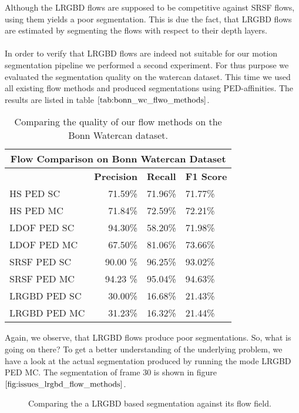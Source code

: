 Although the LRGBD flows are supposed to be competitive against SRSF flows, using them yields a poor segmentation. This is due the fact, that LRGBD flows are estimated by segmenting the flows with respect to their depth layers. \\ \\
In order to verify that LRGBD flows are indeed not suitable for our motion segmentation pipeline we performed a second experiment. For thus purpose we evaluated the segmentation quality on the watercan dataset. This time we used all existing flow methods and produced segmentations using PED-affinities. The results are listed in table $\ref{tab:bonn_wc_flwo_methods}$.
\begin{table}[H]
\centering
\begin{tabular}{|l|r|l|l|}
\hline
\multicolumn{4}{|c|}{Flow Comparison on Bonn Watercan Dataset} \\ \hline
& \textbf{Precision} & \textbf{Recall} & \textbf{F1 Score} \\ \hline            
HS PED SC  & 71.59\%   & 71.96\%     & 71.77\%  \\ \hline
HS PED MC  & 71.84\%   & 72.59\%     & 72.21\%  \\ \hline                        
LDOF PED SC  & 94.30\%   & 58.20\%     & 71.98\%  \\ \hline
LDOF PED MC  & 67.50\%   & 81.06\%     & 73.66\%  \\ \hline
SRSF PED SC & 90.00 \%   & 96.25\%     & 93.02\%  \\ \hline
SRSF PED MC & 94.23 \%   & 95.04\%     & 94.63\%  \\ \hline
LRGBD PED SC & 30.00\%   & 16.68\%     & 21.43\%  \\ \hline
LRGBD PED MC & 31.23\%   & 16.32\%     & 21.44\%  \\ \hline
\end{tabular}
\caption[Flow Method Comparission Bonn Watercan]{Comparing the quality of our flow methods on the Bonn Watercan dataset.}
\label{tab:bonn_wc_flwo_methods}
\end{table}
Again, we observe, that LRGBD flows produce poor segmentations. So, what is going on there? To get a better understanding of the underlying problem, we have a look at the actual segmentation produced by running the mode LRGBD PED MC. The segmentation of frame 30 is shown in figure $\ref{fig:issues_lrgbd_flow_methods}$. 
\begin{figure}[H]
\begin{center}
\end{center}
\caption[Issue with LRGBD Flows]{Comparing the a LRGBD based segmentation against its flow field.}
\label{fig:issues_lrgbd_flow_methods}
\end{figure}
